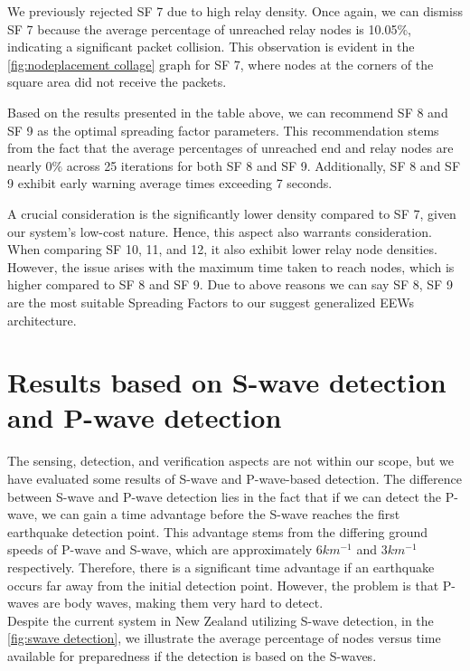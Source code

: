 We previously rejected \ac{SF} 7 due to high relay density. Once again, we can dismiss \ac{SF} 7 because the average percentage of unreached relay nodes is 10.05$\%$, indicating a significant packet collision. This observation is evident in the \autoref{fig:nodeplacement collage} graph for \ac{SF} 7, where nodes at the corners of the square area did not receive the packets.

Based on the results presented in the table above, we can recommend \ac{SF} 8 and \ac{SF} 9 as the optimal spreading factor parameters. This recommendation stems from the fact that the average percentages of unreached end and relay nodes are nearly 0$\%$ across 25 iterations for both \ac{SF} 8 and \ac{SF} 9. Additionally, \ac{SF} 8 and \ac{SF} 9 exhibit early warning average times exceeding 7 seconds. 

A crucial consideration is the significantly lower density compared to \ac{SF} 7, given our system's low-cost nature. Hence, this aspect also warrants consideration. When comparing \ac{SF} 10, 11, and 12, it also exhibit lower relay node densities. However, the issue arises with the maximum time taken to reach nodes, which is higher compared to \ac{SF} 8 and \ac{SF} 9. Due to above reasons we can say \ac{SF} 8, \ac{SF} 9 are the most suitable Spreading Factors to our suggest generalized \ac{EEWs} architecture.

\section{Results based on S-wave detection and P-wave detection}\label{ch:results_s_p}

\hspace{12pt} The sensing, detection, and verification aspects are not within our scope, but we have evaluated some results of S-wave and P-wave-based detection. The difference between S-wave and P-wave detection lies in the fact that if we can detect the P-wave, we can gain a time advantage before the S-wave reaches the first earthquake detection point. This advantage stems from the differing ground speeds of P-wave and S-wave, which are approximately $6 km^{-1}$ and $3 km^{-1}$ respectively. Therefore, there is a significant time advantage if an earthquake occurs far away from the initial detection point. However, the problem is that P-waves are body waves, making them very hard to detect. \\

Despite the current system in New Zealand utilizing S-wave detection, in the \autoref{fig:swave detection}, we illustrate the average percentage of nodes versus time available for preparedness if the detection is based on the S-waves.

